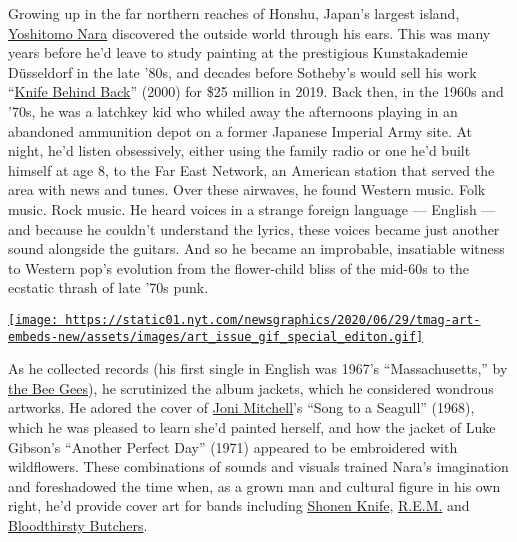 Growing up in the far northern reaches of Honshu, Japan's largest
island,
\href{https://www.pacegallery.com/artists/yoshitomo-nara/}{Yoshitomo
Nara} discovered the outside world through his ears. This was many years
before he'd leave to study painting at the prestigious Kunstakademie
Düsseldorf in the late '80s, and decades before Sotheby's would sell his
work
``\href{https://www.sothebys.com/en/auctions/ecatalogue/2019/contemporary-art-evening-sale-hk0885/lot.1142.html}{Knife
Behind Back}'' (2000) for \$25 million in 2019. Back then, in the 1960s
and '70s, he was a latchkey kid who whiled away the afternoons playing
in an abandoned ammunition depot on a former Japanese Imperial Army
site. At night, he'd listen obsessively, either using the family radio
or one he'd built himself at age 8, to the Far East Network, an American
station that served the area with news and tunes. Over these airwaves,
he found Western music. Folk music. Rock music. He heard voices in a
strange foreign language --- English --- and because he couldn't
understand the lyrics, these voices became just another sound alongside
the guitars. And so he became an improbable, insatiable witness to
Western pop's evolution from the flower-child bliss of the mid-60s to
the ecstatic thrash of late '70s punk.

\href{https://www.nytimes.com/issue/t-magazine/2020/07/02/true-believers-art-issue}{\texttt{[image: https://static01.nyt.com/newsgraphics/2020/06/29/tmag-art-embeds-new/assets/images/art\_issue\_gif\_special\_editon.gif]}}

As he collected records (his first single in English was 1967's
``Massachusetts,'' by
\href{https://www.nytimes.com/1979/02/18/archives/why-the-bee-gees-sound-so-good-the-bee-gees.html}{the
Bee Gees}), he scrutinized the album jackets, which he considered
wondrous artworks. He adored the cover of
\href{https://www.nytimes.com/topic/person/joni-mitchell}{Joni
Mitchell}'s ``Song to a Seagull'' (1968), which he was pleased to learn
she'd painted herself, and how the jacket of Luke Gibson's ``Another
Perfect Day'' (1971) appeared to be embroidered with wildflowers. These
combinations of sounds and visuals trained Nara's imagination and
foreshadowed the time when, as a grown man and cultural figure in his
own right, he'd provide cover art for bands including
\href{https://www.moma.org/collection/works/88514}{Shonen Knife},
\href{https://en.wikipedia.org/wiki/I\%27ll_Take_the_Rain\#/media/File:R.E.M._-_I'll_Take_the_Rain.jpg}{R.E.M.}
and
\href{https://en.wikipedia.org/wiki/Bloodthirsty_butchers_vs_\%2B/-_PLUS/MINUS\#/media/File:Butcherssplit.jpg}{Bloodthirsty
Butchers}.

